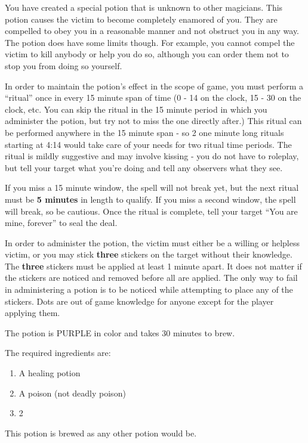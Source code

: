 \documentclass[green]{NeptuneBall}
\begin{document}
\name{\gLove{}}

You have created a special potion that is unknown to other magicians. This potion causes the victim to become completely enamored of you. They are compelled to obey you in a reasonable manner and not obstruct you in any way. The potion does have some limits though. For example, you cannot compel the victim to kill anybody or help you do so, although you can order them not to stop you from doing so yourself.

In order to maintain the potion's effect in the scope of game, you must perform a ``ritual'' once in every 15 minute span of time (0 - 14 on the clock, 15 - 30 on the clock, etc. You can skip the ritual in the 15 minute period in which you administer the potion, but try not to miss the one directly after.) This ritual can be performed anywhere in the 15 minute span - so 2 one minute long rituals starting at 4:14 would take care of your needs for two ritual time periods. The ritual is mildly suggestive and may involve kissing - you do not have to roleplay, but tell your target what you're doing and tell any observers what they see.

If you miss a 15 minute window, the spell will not break yet, but the next ritual must be {\bf5 minutes} in length to qualify. If you miss a second window, the spell will break, so be cautious. Once the ritual is complete, tell your target ``You are mine, forever'' to seal the deal.

In order to administer the potion, the victim must either be a willing or helpless victim, or you may stick {\bf three} stickers on the target without their knowledge. The {\bf three} stickers must be applied at least 1 minute apart. It does not matter if the stickers are noticed and removed before all are applied. The only way to fail in administering a potion is to be noticed while attempting to place any of the stickers. Dots are out of game knowledge for anyone except for the player applying them.

The potion is PURPLE in color and takes 30 minutes to brew.

The required ingredients are:
\begin{enumerate}
\item A healing potion 
\item A poison (not deadly poison)
\item 2 \iPearl{}
\end{enumerate}

This potion is brewed as any other potion would be.\\
\end{document}
